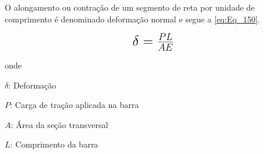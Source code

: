 O alongamento ou contração de um segmento de reta por unidade de comprimento é denominado deformação normal e segue a \autoref{eq:Eq_150}.

\begin{equation}\label{eq:Eq_150}%
\mbox{\fontsize{17.28}{21.6}\selectfont\( %
\delta = \frac{PL}{AE}
\)} %
\end{equation}

onde

$\delta $: Deformação

$P$: Carga de tração aplicada na barra

$A$: Área da seção transversal

$L$: Comprimento da barra

\hfill

%
%
%
%
%
